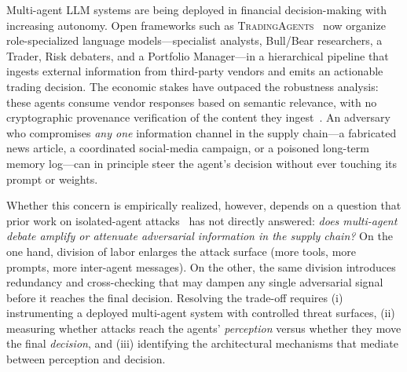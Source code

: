 \documentclass[10pt,letterpaper]{article}
\newcommand{\TA}{\textsc{TradingAgents}}
\begin{document}
Multi-agent LLM systems are being deployed in financial decision-making
with increasing autonomy. Open frameworks such as
\TA{}~\citep{xiao2024tradingagents} now organize role-specialized
language models---specialist analysts, Bull/Bear researchers, a Trader,
Risk debaters, and a Portfolio Manager---in a hierarchical pipeline that
ingests external information from third-party vendors and emits an
actionable trading decision. The economic stakes have outpaced the
robustness analysis: these agents consume vendor responses based on
semantic relevance, with no cryptographic provenance verification of the
content they ingest~\citep{tradetrap2025}. An adversary who compromises
\emph{any one} information channel in the supply chain---a fabricated
news article, a coordinated social-media campaign, or a poisoned
long-term memory log---can in principle steer the agent's decision
without ever touching its prompt or weights.

Whether this concern is empirically realized, however, depends on a
question that prior work on isolated-agent
attacks~\citep{zhang2025asb,dong2025minja,srivastava2025memorygraft} has
not directly answered: \emph{does multi-agent debate amplify or
attenuate adversarial information in the supply chain?} On the one
hand, division of labor enlarges the attack surface (more tools, more
prompts, more inter-agent messages). On the other, the same division
introduces redundancy and cross-checking that may dampen any single
adversarial signal before it reaches the final decision. Resolving the
trade-off requires (i) instrumenting a deployed multi-agent system with
controlled threat surfaces, (ii) measuring whether attacks reach the
agents' \emph{perception} versus whether they move the final
\emph{decision}, and (iii) identifying the architectural mechanisms that
mediate between perception and decision.
\end{document}
